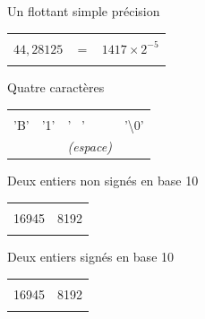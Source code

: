 \documentclass[11pt,a4paper]{article}
\begin{document}
\begin{table}[!ht]
  \centering
  \begin{minipage}{0.50\textwidth}
    \centering

Un flottant simple précision

\medskip

\begin{tabular}{| C{5cm} |}
\hline
\phantom{42} \\
$ 44,28125 $  $\;\; = \; \;$  $ 1417 \times 2^{-5} $ \\
\phantom{42} \\
\hline
\end{tabular}

  \end{minipage}
  \hfillx
  \begin{minipage}{0.50\textwidth}
    \centering

Quatre caractères

\medskip

\begin{tabular}{| C{1cm} | C{1cm} | C{1cm} | C{1cm} |}
\hline
\phantom{I} & \phantom{I} & \phantom{I} & \phantom{I} \\
'B' & '1' & ' $\,$ ' & '\textbackslash{}0' \\
\phantom{I} & \phantom{I} & {\footnotesize \textit{(espace)}} & \phantom{I} \\
\hline
\end{tabular}

  \end{minipage}
\end{table}

\smallskip

\begin{table}[!ht]
  \centering
  \begin{minipage}{0.50\textwidth}
    \centering

Deux entiers non signés en base 10

\medskip

\begin{tabular}{| C{3cm} | C{3cm} |}
\hline
\phantom{42} & \phantom{42} \\
16945 & 8192 \\
\phantom{42} & \phantom{42} \\
\hline
\end{tabular}

  \end{minipage}
  \hfillx
  \begin{minipage}{0.50\textwidth}
    \centering

Deux entiers signés en base 10

\medskip

\begin{tabular}{| C{3cm} | C{3cm} |}
\hline
\phantom{42} & \phantom{42} \\
16945 & 8192 \\
\phantom{42} & \phantom{42} \\
\hline
\end{tabular}

  \end{minipage}
\end{table}
\end{document}
